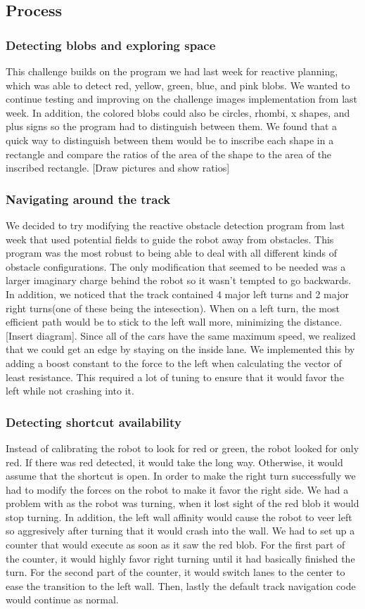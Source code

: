 \documentclass[journal, a4paper]{IEEEtran}
\begin{document}
\subsection{Process}
\subsubsection{Detecting blobs and exploring space}
This challenge builds on the program we had last week for reactive planning, which was able to detect red, yellow, green, blue, and pink blobs. We wanted to continue testing and improving on the challenge images implementation from last week. In addition, the colored blobs could also be circles, rhombi, x shapes, and plus signs so the program had to distinguish between them. We found that a quick way to distinguish between them would be to inscribe each shape in a rectangle and compare the ratios of the area of the shape to the area of the inscribed rectangle. [Draw pictures and show ratios]
\subsubsection{Navigating around the track}
We decided to try modifying the reactive obstacle detection program from last week that used potential fields to guide the robot away from obstacles. This program was the most robust to being able to deal with all different kinds of obstacle configurations. The only modification that seemed to be needed was a larger imaginary charge behind the robot so it wasn't tempted to go backwards. In addition, we noticed that the track contained 4 major left turns and 2 major right turns(one of these being the intesection). When on a left turn, the most efficient path would be to stick to the left wall more, minimizing the distance. [Insert diagram]. Since all of the cars have the same maximum speed, we realized that we could get an edge by staying on the inside lane. We implemented this by adding a boost constant to the force to the left when calculating the vector of least resistance. This required a lot of tuning to ensure that it would favor the left while not crashing into it. 
\subsubsection{Detecting shortcut availability}
Instead of calibrating the robot to look for red or green, the robot looked for only red. If there was red detected, it would take the long way. Otherwise, it would assume that the shortcut is open. In order to make the right turn successfully we had to modify the forces on the robot to make it favor the right side. We had a problem with as the robot was turning, when it lost sight of the red blob it would stop turning. In addition, the left wall affinity would cause the robot to veer left so aggresively after turning that it would crash into the wall. We had to set up a counter that would execute as soon as it saw the red blob. For the first part of the counter, it would highly favor right turning until it had basically finished the turn. For the second part of the counter, it would switch lanes to the center to ease the transition to the left wall. Then, lastly the default track navigation code would continue as normal. 
\end{document}
